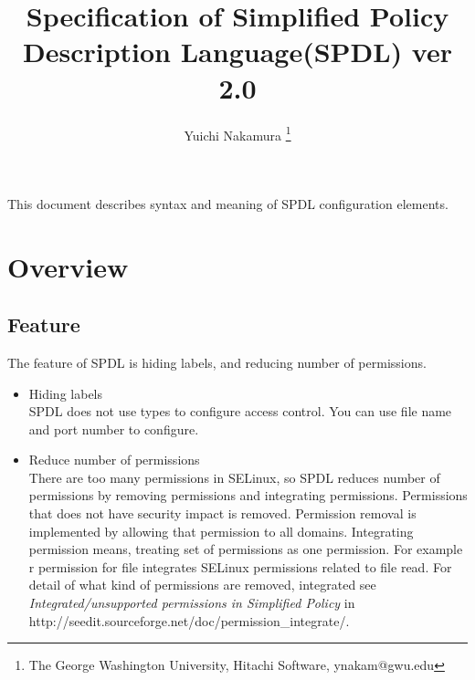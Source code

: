 \documentclass{article}
\title{Specification of Simplified Policy Description Language(SPDL) ver 2.0}
\author{Yuichi Nakamura \thanks{The George Washington University, Hitachi Software, ynakam@gwu.edu}}
\begin{document}
\maketitle
\tableofcontents
\newpage
This document describes syntax and meaning of SPDL configuration elements.



\section{Overview}
\subsection{Feature}
The feature of SPDL is hiding labels, and reducing number of
permissions.
\begin{itemize}
 \item Hiding labels\\
       SPDL does not use types to configure access control. You can use
       file name and port number to configure.
 \item Reduce number of permissions\\
       There are too many permissions in SELinux, so SPDL reduces number
       of permissions by removing permissions and integrating
       permissions.
       Permissions that does not have security impact is
       removed. Permission removal is implemented by allowing that
       permission to all domains. Integrating permission means, treating
       set of permissions as one permission. For example r permission
       for file integrates SELinux permissions related to file read.
       For detail of what kind of permissions are removed, integrated  see {\it
       Integrated/unsupported permissions in Simplified Policy } in
       http://seedit.sourceforge.net/doc/permission\_integrate/.
\end{itemize}
\end{document}
